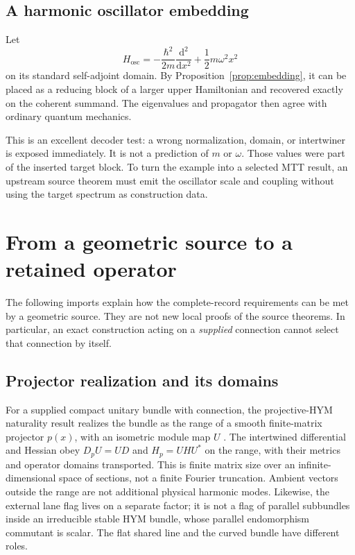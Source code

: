 \documentclass[11pt]{article}
\theoremstyle{definition}
\theoremstyle{remark}
\newcommand{\dd}{\mathrm d}
\begin{document}
\subsection{A harmonic oscillator embedding}

Let
\[
H_{\mathrm{osc}}
=-\frac{\hbar^2}{2m}\frac{\dd^2}{\dd x^2}
+\frac12m\omega^2x^2
\]
on its standard self-adjoint domain.  By
Proposition~\ref{prop:embedding}, it can be placed as a reducing block of a larger
upper Hamiltonian and recovered exactly on the coherent summand.  The
eigenvalues and propagator then agree with ordinary quantum mechanics.

This is an excellent decoder test: a wrong normalization, domain, or
intertwiner is exposed immediately.  It is not a prediction of \(m\) or
\(\omega\).  Those values were part of the inserted target block.  To turn
the example into a selected MTT result, an upstream source theorem must emit
the oscillator scale and coupling without using the target spectrum as
construction data.

\section{From a geometric source to a retained operator}
\label{sec:geometry-interface}

The following imports explain how the complete-record requirements can be
met by a geometric source. They are not new local proofs of the source
theorems. In particular, an exact construction acting on a \emph{supplied}
connection cannot select that connection by itself.

\subsection{Projector realization and its domains}
\label{sec:projective-hym}
For a supplied compact unitary bundle with connection, the projective-HYM
naturality result realizes the bundle as the range of a smooth finite-matrix
projector \(p(x)\), with an isometric module map \(U\)
\cite{FrozenProjectiveHYM}. The intertwined differential and Hessian obey
\(D_pU=UD\) and \(H_p=UHU^*\) on the range, with their metrics and operator
domains transported. This is finite matrix size over an infinite-dimensional
space of sections, not a finite Fourier truncation. Ambient vectors outside
the range are not additional physical harmonic modes. Likewise, the external
lane flag lives on a separate factor; it is not a flag of parallel
subbundles inside an irreducible stable HYM bundle, whose parallel
endomorphism commutant is scalar. The flat shared line and the curved bundle
have different roles.
\end{document}
